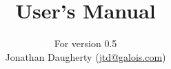 \title{ User's Manual}
\author{
  For  version 0.5\\
  Jonathan Daugherty (\href{mailto:jtd@galois.com}{jtd@galois.com})
}
\maketitle
